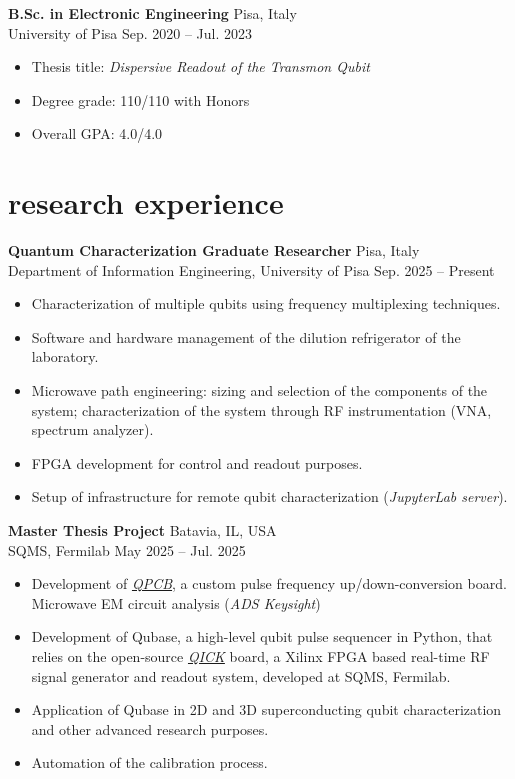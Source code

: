 \documentclass[10pt]{article}
\newcommand{\entry}[4]{{{\textbf{#1}}} \hfill #3 \\ #2 \hfill #4}
\begin{document}
\smallskip

\entry{B.Sc. in Electronic Engineering}{University of Pisa}{Pisa, Italy}{Sep. 2020 -- Jul. 2023}
\begin{itemize}[noitemsep,leftmargin=3.5mm,rightmargin=0mm,topsep=6pt]
  \item Thesis title: \textit{Dispersive Readout of  the Transmon Qubit}
  \item Degree grade: 110/110 with Honors
  \item Overall GPA: 4.0/4.0

\end{itemize}

\section{research experience}

\entry{Quantum Characterization Graduate Researcher}{Department of Information Engineering, University of Pisa}{Pisa, Italy}{Sep. 2025 -- Present}
\begin{itemize}[noitemsep,leftmargin=3.5mm,rightmargin=0mm,topsep=6pt]
    \item Characterization of multiple qubits using frequency multiplexing techniques.
    \item Software and hardware management of the dilution refrigerator of the laboratory.
    \item Microwave path engineering: sizing and selection of the components of the system; characterization of the system through RF instrumentation (VNA, spectrum analyzer).
    \item FPGA development for control and readout purposes.
    \item Setup of infrastructure for remote qubit characterization (\textit{JupyterLab server}).
\end{itemize}

\entry{Master Thesis Project}{SQMS, Fermilab}{Batavia, IL, USA}{May 2025 -- Jul. 2025}
\begin{itemize}[noitemsep,leftmargin=3.5mm,rightmargin=0mm,topsep=6pt]
    \item Development of \textit{\href{https://github.com/leonardobove/qpcb}{QPCB}}, a custom pulse frequency up/down-conversion board. Microwave EM circuit analysis (\textit{ADS Keysight})
    \item Development of Qubase, a high-level qubit pulse sequencer in Python, that relies on the open-source \textit{\href{https://github.com/openquantumhardware/qick}{QICK}} board, a Xilinx FPGA based real-time RF signal generator and readout system, developed at SQMS, Fermilab.
    \item Application of Qubase in 2D and 3D superconducting qubit characterization and other advanced research purposes.
    \item Automation of the calibration process.
\end{itemize}
\end{document}
